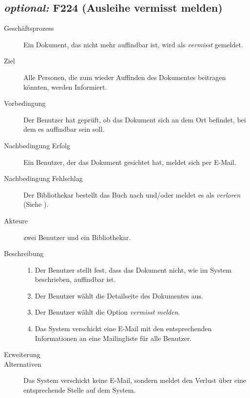 \subsection{\emph{optional:} F224 (Ausleihe vermisst melden)}
\begin{description}
  \item[Geschäftsprozess]Ein Dokument, das nicht mehr auffindbar ist, wird als \emph{vermisst} gemeldet.
  \item[Ziel]Alle Personen, die zum wieder Auffinden des Dokumentes beitragen könnten, werden Informiert.
  \item[Vorbedingung]Der Benutzer hat geprüft, ob das Dokument sich an dem Ort befindet, bei dem es auffindbar sein soll.
  \item[Nachbedingung Erfolg]Ein Benutzer, der das Dokument gesichtet hat, meldet sich per E-Mail.
  \item[Nachbedingung Fehlschlag]Der Bibliothekar bestellt das Buch nach und/oder meldet es als \emph{verloren} (Siehe ).
  \item[Akteure]zwei Benutzer und ein Bibliothekar.
  \item[Beschreibung]\hfill
    \begin{enumerate}
      \item Der Benutzer stellt fest, dass das Dokument nicht, wie im System beschrieben, auffindbar ist.
      \item Der Benutzer wählt die Detailseite des Dokumentes aus.
      \item Der Benutzer wählt die Option \emph{vermisst melden}.
      \item Das System verschickt eine E-Mail mit den entsprechenden Informationen an eine Mailingliste für alle Benutzer.
    \end{enumerate}
  \item[Erweiterung]
  \item[Alternativen]Das System verschickt keine E-Mail, sondern meldet den Verlust über eine entsprechende Stelle auf dem System.
\end{description}

